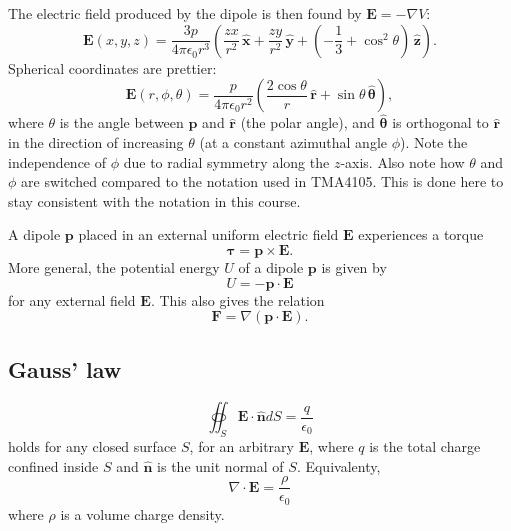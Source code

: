 \documentclass[a4paper, 12pt]{article}
\renewcommand{\vec}[1]{\bm{#1}}
\newcommand{\E}{\ensuremath{\vec{E}}}
\newcommand{\e}{\ensuremath{\epsilon_0}}
\let\tmp\hat
\renewcommand{\hat}[1]{\vec{\tmp{#1}}}
\begin{document}
    The electric field produced by the dipole is then found by $\E = -\nabla V$:
    \begin{equation}
        \E(x, y, z) = \frac{3p}{4\pi\e r^3}\left(\frac{zx}{r^2}\,\hat{x} + 
        \frac{zy}{r^2}\,\hat{y} + \left( -\frac{1}{3} +\cos^2\theta\right)\,\hat{z}\right).
    \end{equation}
    Spherical coordinates are prettier: 
    \begin{equation}
        \E(r, \phi, \theta) = \frac{p}{4\pi\e r^2}\left(\frac{2\cos\theta}{r}\,\hat{r} + \sin\theta \, \hat{\theta}\right),
    \end{equation}
    where $\theta$ is the angle between $\vec{p}$ and $\hat{r}$ (the polar angle), 
    and $\hat{\theta}$ is orthogonal to $\hat{r}$ in the direction of increasing $\theta$ (at a constant azimuthal angle $\phi$). 
    Note the independence of $\phi$ due to radial symmetry along the $z$-axis. 
    Also note how $\theta$ and $\phi$ are switched compared to the notation used in TMA4105. 
    This is done here to stay consistent with the notation in this course.
    
    A dipole $\vec{p}$ placed in an external uniform electric field $\E$ experiences a torque
    \begin{equation}
        \vec{\tau} = \vec{p} \times \E.
    \end{equation}
    More general, the potential energy $U$ of a dipole $\vec{p}$ is given by
    \begin{equation}
        U = -\vec{p}\cdot \E
    \end{equation}
    for any external field $\E$. This also gives the relation 
    \begin{equation}
        \vec{F} = \nabla\left(\vec{p}\cdot\E\right).
    \end{equation}

\subsection{Gauss' law}
    \begin{equation}
        \oiint_S \E\cdot\hat{n}dS = \frac{q}{\e}
    \end{equation}
    holds for any closed surface $S$, for an arbitrary $\E$, 
    where $q$ is the total charge confined inside $S$ and $\hat{n}$ is the unit normal of $S$. Equivalenty, 
    \begin{equation}
        \nabla \cdot \E = \frac{\rho}{\e}
    \end{equation}
    where $\rho$ is a volume charge density. 
\end{document}
